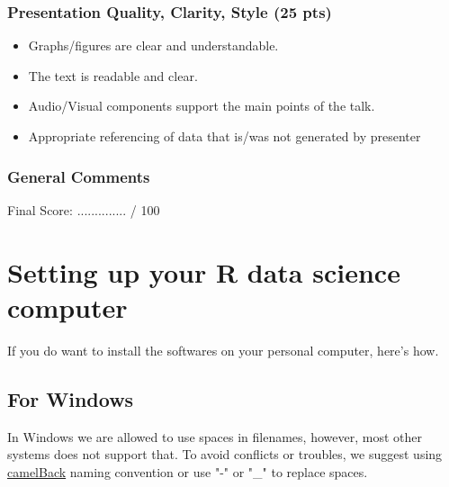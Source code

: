 \documentclass[11pt]{article} %
\begin{document}
\subsubsection{Presentation Quality, Clarity, Style (25 pts)}
\begin{itemize}  \itemsep0pt
    \item{Graphs/figures are clear and understandable.}
    \item{The text is readable and clear.}
    \item{Audio/Visual components support the main points of the talk.}
    \item{Appropriate referencing of data that is/was not generated by presenter}
\end{itemize}

\subsubsection{General  Comments}
\begin{flushright}
Final Score:  ..............  / 100
\end{flushright}



\pagebreak


\section{Setting up your R data science computer} \label{SetupR}
If you do want to install the softwares on your personal computer, here's how.

  \subsection{For Windows}
    In Windows we are allowed to use spaces in filenames, however, most other systems does not support that. 
    To avoid conflicts or troubles, we suggest using \href{https://sanaulla.info/2008/06/25/camelcase-notation-naming-convention-for-programming-languages/}{camelBack} naming convention or use "-" or "\_" to replace spaces. 
  
\end{document}
